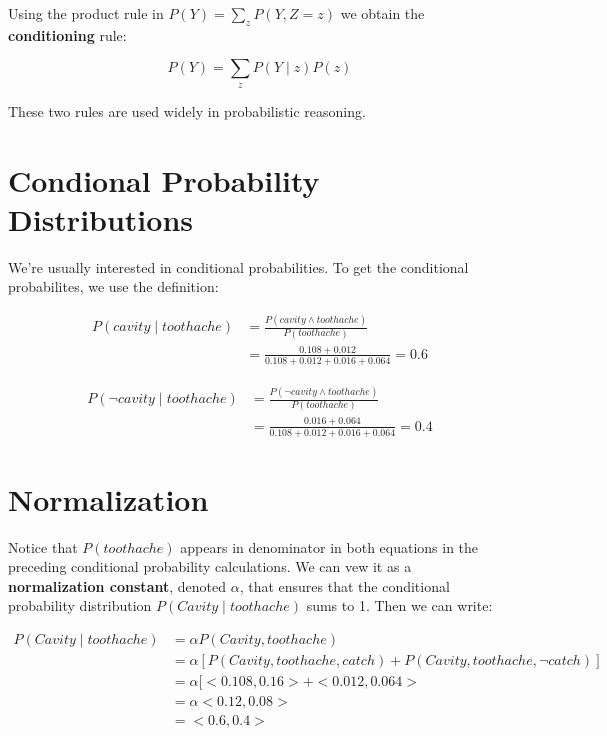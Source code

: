 \documentclass[11pt]{article}
\begin{document}
Using the product rule in \(P(Y) = \sum_z P(Y, Z=z)\) we obtain the \textbf{conditioning} rule:

\vspace{-.1in}
\[
P(Y) = \sum_z P(Y \mid z) P(z)
\]
\vspace{-.1in}

These two rules are used widely in probabilistic reasoning.
\section{Condional Probability Distributions}
\label{sec:orgc65a121}

We're usually interested in conditional probabilities.  To get the conditional probabilites, we use the definition:

\begin{align*}
P(cavity  \mid  toothache) &= \frac{P(cavity \land toothache)}{P(toothache)}\\
                       &= \frac{0.108 + 0.012}{0.108 + 0.012 + 0.016 + 0.064} = 0.6
\end{align*}

\begin{align*}
P(\neg cavity  \mid  toothache) &= \frac{P(\neg cavity \land toothache)}{P(toothache)}\\
                            &= \frac{0.016 + 0.064}{0.108 + 0.012 + 0.016 + 0.064} = 0.4
\end{align*}
\section{Normalization}
\label{sec:org35ab9df}

Notice that \(P(toothache)\) appears in denominator in both equations in the preceding conditional probability calculations.  We can vew it as a \textbf{normalization constant}, denoted \(\alpha\), that ensures that the conditional probability distribution \(P(Cavity  \mid  toothache)\) sums to 1.  Then we can write:

\vspace{-.25in}
\begin{align*}
P(Cavity  \mid  toothache) &= \alpha P(Cavity, toothache) \\
                       &= \alpha [ P(Cavity, toothache, catch) + P(Cavity, toothache, \neg catch)] \\
                       &= \alpha [<0.108, 0.16> + <0.012, 0.064>\\
                       &= \alpha <0.12, 0.08> \\
                       &= <0.6, 0.4>
\end{align*}
\end{document}
